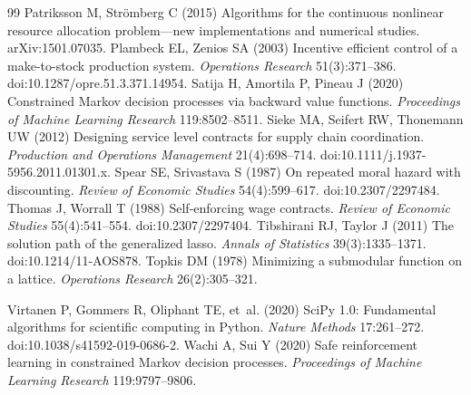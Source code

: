 \documentclass[11pt,letterpaper]{article}
\theoremstyle{definition}
\newcommand{\1}{\mathbf 1}
\begin{document}
\begin{thebibliography}{99}
Patriksson M, Str\"omberg C (2015) Algorithms for the continuous nonlinear resource allocation problem---new implementations and numerical studies. arXiv:1501.07035.
Plambeck EL, Zenios SA (2003) Incentive efficient control of a make-to-stock production system. \emph{Operations Research} 51(3):371--386. doi:10.1287/opre.51.3.371.14954.
Satija H, Amortila P, Pineau J (2020) Constrained Markov decision processes via backward value functions. \emph{Proceedings of Machine Learning Research} 119:8502--8511.
Sieke MA, Seifert RW, Thonemann UW (2012) Designing service level contracts for supply chain coordination. \emph{Production and Operations Management} 21(4):698--714. doi:10.1111/j.1937-5956.2011.01301.x.
Spear SE, Srivastava S (1987) On repeated moral hazard with discounting. \emph{Review of Economic Studies} 54(4):599--617. doi:10.2307/2297484.
Thomas J, Worrall T (1988) Self-enforcing wage contracts. \emph{Review of Economic Studies} 55(4):541--554. doi:10.2307/2297404.
Tibshirani RJ, Taylor J (2011) The solution path of the generalized lasso. \emph{Annals of Statistics} 39(3):1335--1371. doi:10.1214/11-AOS878.
Topkis DM (1978) Minimizing a submodular function on a lattice. \emph{Operations Research} 26(2):305--321.


Virtanen P, Gommers R, Oliphant TE, et~al. (2020) SciPy 1.0: Fundamental algorithms for scientific computing in Python. \emph{Nature Methods} 17:261--272. doi:10.1038/s41592-019-0686-2.
Wachi A, Sui Y (2020) Safe reinforcement learning in constrained Markov decision processes. \emph{Proceedings of Machine Learning Research} 119:9797--9806.

\end{thebibliography}


\label{r19-reference-end}
\end{document}
